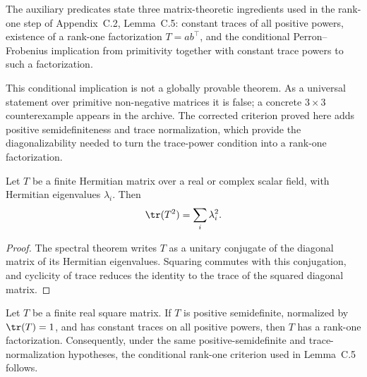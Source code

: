\begin{definition}
    \label{def:matrix_trace_rankone_predicates}
    \leanok
    The auxiliary predicates state three matrix-theoretic ingredients used in
    the rank-one step of Appendix~C.2, Lemma~C.5: constant traces of all
    positive powers, existence of a rank-one factorization $T = a b^\top$, and
    the conditional Perron--Frobenius implication from primitivity together with
    constant trace powers to such a factorization.

    This conditional implication is not a globally provable theorem. As a
    universal statement over primitive non-negative matrices it is false; a
    concrete $3 \times 3$ counterexample appears in the archive. The
    corrected criterion proved here adds positive semidefiniteness and trace
    normalization, which provide the diagonalizability needed to turn the
    trace-power condition into a rank-one factorization.
\end{definition}

\begin{theorem}
    \label{thm:matrix_hermitian_trace_square_eigenvalues}
    \leanok
    Let $T$ be a finite Hermitian matrix over a real or complex scalar field,
    with Hermitian eigenvalues $\lambda_i$. Then
    \[
        \tr(T^2) = \sum_i \lambda_i^2.
    \]
\end{theorem}

\begin{proof}
    \leanok
    The spectral theorem writes $T$ as a unitary conjugate of the diagonal
    matrix of its Hermitian eigenvalues. Squaring commutes with this conjugation,
    and cyclicity of trace reduces the identity to the trace of the squared
    diagonal matrix.
\end{proof}

\begin{theorem}
    \label{thm:matrix_psd_trace_power_rank_one}
    \leanok
    Let $T$ be a finite real square matrix. If $T$ is positive semidefinite,
    normalized by $\tr(T)=1$, and has constant traces on all positive powers,
    then $T$ has a rank-one factorization. Consequently, under the same
    positive-semidefinite and trace-normalization hypotheses, the conditional
    rank-one criterion used in Lemma~C.5 follows.
\end{theorem}

